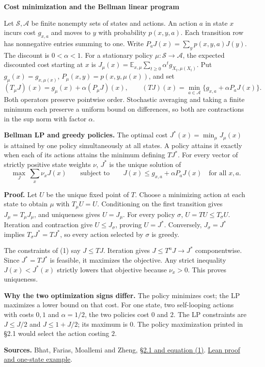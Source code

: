 \documentclass[11pt,a4paper]{article}
\newcommand{\lead}[1]{\par\smallskip\textbf{#1}\enspace}
\begin{document}
{\LARGE\bfseries Cost minimization and the Bellman linear program\par}
\medskip
Let \(\mathcal S,\mathcal A\) be finite nonempty sets of states and actions.
An action \(a\) in state \(x\) incurs cost \(g_{x,a}\) and moves to \(y\) with
probability \(p(x,y,a)\). Each transition row has nonnegative entries summing
to one. Write \(P_aJ(x)=\sum_y p(x,y,a)J(y)\). The discount is \(0<\alpha<1\).
For a stationary policy \(\mu:\mathcal S\to\mathcal A\), the expected discounted
cost starting at \(x\) is \(J_\mu(x)=\mathbb E_{x,\mu}\sum_{t\ge0}\alpha^t
g_{X_t,\mu(X_t)}\). Put \(g_\mu(x)=g_{x,\mu(x)}\), \(P_\mu(x,y)=p(x,y,\mu(x))\), and set
\[
 (T_\mu J)(x)=g_\mu(x)+\alpha(P_\mu J)(x),\qquad
 (TJ)(x)=\min_{a\in\mathcal A}\{g_{x,a}+\alpha P_aJ(x)\}.
\]
Both operators preserve pointwise order. Stochastic averaging and taking a
finite minimum each preserve a uniform bound on differences, so both are
contractions in the sup norm with factor \(\alpha\).

\lead{Bellman LP and greedy policies.}
The optimal cost \(J^*(x)=\min_\mu J_\mu(x)\) is attained by one policy
simultaneously at all states. A policy attains it exactly when each of its
actions attains the minimum defining \(TJ^*\). For every vector of strictly
positive state weights \(\nu\), \(J^*\) is the unique solution of
\[
 \max_J\ \sum_x\nu_xJ(x)
 \qquad\text{subject to}\qquad
 J(x)\le g_{x,a}+\alpha P_aJ(x)\quad\text{for all }x,a. \tag{1}
\]

\lead{Proof.}
Let \(U\) be the unique fixed point of \(T\). Choose a minimizing action at
each state to obtain \(\mu\) with \(T_\mu U=U\). Conditioning on the first
transition gives \(J_\mu=T_\mu J_\mu\), and uniqueness gives \(U=J_\mu\).
For every policy \(\sigma\), \(U=TU\le T_\sigma U\). Iteration and contraction
give \(U\le J_\sigma\), proving \(U=J^*\). Conversely, \(J_\sigma=J^*\)
implies \(T_\sigma J^*=TJ^*\), so every action selected by \(\sigma\) is greedy.

The constraints of (1) say \(J\le TJ\). Iteration gives \(J\le T^nJ\to J^*\)
componentwise. Since \(J^*=TJ^*\) is feasible, it maximizes the objective.
Any strict inequality \(J(x)<J^*(x)\) strictly lowers that objective because
\(\nu_x>0\). This proves uniqueness.

\lead{Why the two optimization signs differ.}
The policy minimizes cost; the LP maximizes a lower bound on that cost.
For one state, two self-looping actions with costs \(0,1\) and
\(\alpha=1/2\), the two policies cost \(0\) and \(2\). The LP constraints
are \(J\le J/2\) and \(J\le 1+J/2\); its maximum is \(0\).
The policy maximization printed in \S2.1 would select the action costing \(2\).
\smallskip

{\small\textbf{Sources.} Bhat, Farias, Moallemi and Zheng,
\href{https://moallemi.com/ciamac/papers/kernel-adp-2012.pdf\#page=5}{\S2.1 and equation (1)}.
\href{https://github.com/nikhilpb/kadp/blob/main/lean/BellmanLP.lean}{Lean proof and one-state example}.}
\end{document}
